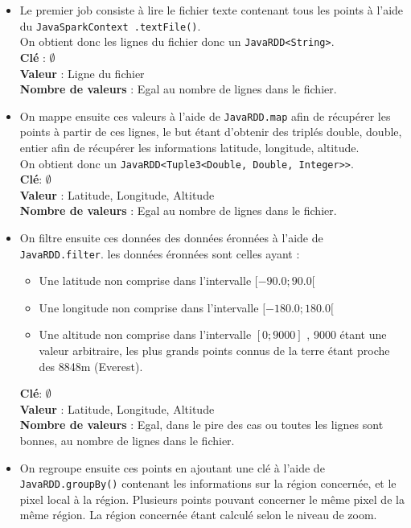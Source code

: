 \documentclass[a4paper]{article}
\begin{document}
\begin{itemize}
\item Le premier job consiste à lire le fichier texte contenant tous les points à l'aide du \texttt{JavaSparkContext .textFile()}.
\\
On obtient donc les lignes du fichier donc un \texttt{JavaRDD<String>}.
\\
\textbf{Clé} : $\emptyset$
\\
\textbf{Valeur} : Ligne du fichier
\\
\textbf{Nombre de valeurs} : Egal au nombre de lignes dans le fichier.
\item On mappe ensuite ces valeurs à l'aide de \texttt{JavaRDD.map} afin de récupérer les points à partir de ces lignes, le but étant d'obtenir des triplés {double, double, entier} afin de récupérer les informations latitude, longitude, altitude. 
\\
On obtient  donc un \texttt{JavaRDD<Tuple3<Double, Double, Integer>>}.
\\
\textbf{Clé}: $\emptyset$
\\
\textbf{Valeur}  : {Latitude, Longitude, Altitude}
\\
\textbf{Nombre de valeurs} : Egal au nombre de lignes dans le fichier.
\item On filtre ensuite ces données des données éronnées à l'aide de \texttt{JavaRDD.filter}. les données éronnées sont celles ayant :
\begin{itemize}
\item Une latitude non comprise dans l'intervalle $ [-90.0; 90.0[$
\item Une longitude non comprise dans l'intervalle $[-180.0; 180.0[$
\item Une altitude non comprise dans l'intervalle $[0; 9000]$ , 9000 étant une valeur arbitraire, les plus grands points connus de la terre étant proche des 8848m (Everest).
\end{itemize}
\textbf{Clé}: $\emptyset$
\\
\textbf{Valeur}  : {Latitude, Longitude, Altitude}
\\
\textbf{Nombre de valeurs} : Egal, dans le pire des cas ou toutes les lignes sont bonnes, au nombre de lignes dans le fichier.
\item On regroupe ensuite ces points en ajoutant une clé à l'aide de \texttt{JavaRDD.groupBy()} contenant les informations sur la région concernée, et le pixel local à la région. Plusieurs points pouvant concerner le même pixel de la même région. La région concernée étant calculé selon le niveau de zoom.

\end{itemize}
\end{document}
